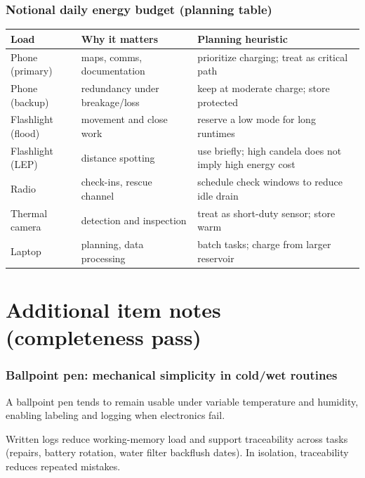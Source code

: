 \begin{frame}[t,shrink=6]
  \frametitle{Notional daily energy budget (planning table)}
  \justifying
  \DenseBodySize
  \begin{table}
    \centering
    \begin{tabularx}{\textwidth}{@{}l>{\raggedright\arraybackslash}X>{\raggedright\arraybackslash}X@{}}
      \toprule
      \textbf{Load} & \textbf{Why it matters} & \textbf{Planning heuristic} \\
      \midrule
      Phone (primary) & maps, comms, documentation & prioritize charging; treat as critical path \\
      Phone (backup) & redundancy under breakage/loss & keep at moderate charge; store protected \\
      Flashlight (flood) & movement and close work & reserve a low mode for long runtimes \\
      Flashlight (LEP) & distance spotting & use briefly; high candela does not imply high energy cost \\
      Radio & check-ins, rescue channel & schedule check windows to reduce idle drain \\
      Thermal camera & detection and inspection & treat as short-duty sensor; store warm \\
      Laptop & planning, data processing & batch tasks; charge from larger reservoir \\
      \bottomrule
    \end{tabularx}
  \end{table}
\end{frame}

\section{Additional item notes (completeness pass)}

\begin{frame}[t]
  \frametitle{Ballpoint pen: mechanical simplicity in cold/wet routines}
  \justifying
   A ballpoint pen tends to remain usable under variable temperature and humidity, enabling labeling and logging when electronics fail.

  \vspace{0.5em}
   Written logs reduce working-memory load and support traceability across tasks (repairs, battery rotation, water filter backflush dates). In isolation, traceability reduces repeated mistakes.
\end{frame}

